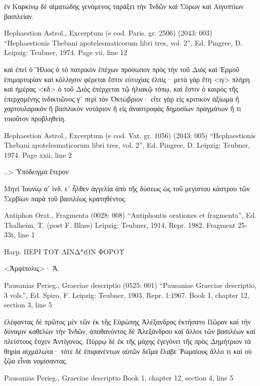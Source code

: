 \documentclass[12pt,letterpaper,twoside,final]{memoir}
\begin{document}
\begin{greek}
       ἐν Καρκίνῳ δὲ αἱματώδης γενόμενος ταράξει τὴν 
Ἰνδῶν καὶ Σύρων καὶ Αἰγυπτίων βασιλείαν. 



Hephaestion Astrol., Excerptum (e cod. Paris. gr. 2506) (2043: 003)
“Hephaestionis Thebani apotelesmaticorum libri tres, vol. 2”, Ed. Pingree, D.
Leipzig: Teubner, 1974.
Page vii, line 12

      καὶ ἐπεὶ ὁ Ἥλιος ὁ τὸ πατρικὸν ἐπέχων πρόσωπον 
πρὸς τὴν τοῦ Διὸς καὶ Ἑρμοῦ ἐπιμαρτυρίαν καὶ κόλλησιν 
φέρεται ἔστιν εὐτυχίας ἐλπίς· μετὰ γὰρ ἔτη <ιγ> πλήρη 
καὶ ἡμέρας <κδ> ὁ τοῦ Διὸς ἐπέρχεται τῷ ἡλιακῷ 
τόπῳ, καὶ ἔστιν ὁ καιρὸς τῆς ἐπερχομένης ἰνδικτιῶνος 
γʹ περὶ τὸν Ὀκτώβριον· εἴτε γὰρ εἰς κριτικὸν ἀξίωμα ἢ 
χαρτουλαρικὸν ἢ βασιλικὸν νοτάριον ἢ εἰς ἀναστροφὰς 
δημοσίων πραγμάτων ἤ τι τοιοῦτον προβληθείη. 



Hephaestion Astrol., Excerptum (e cod. Vat. gr. 1056) (2043: 005)
“Hephaestionis Thebani apotelesmaticorum libri tres, vol. 2”, Ed. Pingree, D.
Leipzig: Teubner, 1974.
Page xxii, line 2

                                                  ..>   
Ὑπόδειγμα ἕτερον


 Μηνὶ Ἰουνίῳ αʹ ἰνδ. εʹ ἦλθεν ἀγγελία ἀπὸ τῆς δύσεως 
ὡς τοῦ μεγίστου κάστρου τῶν Σερβίων παρὰ τοῦ βασιλέως 
κρατηθέντος. 



Antiphon Orat., Fragmenta (0028: 008)
“Antiphontis orationes et fragmenta”, Ed. Thalheim, T. (post F. Blass)
Leipzig: Teubner, 1914, Repr. 1982.
Fragment 25-33t, line 1

                                                   Harp. 
ΠΕΡΙ ΤΟΥ ΛΙΝΔ*ιΩΝ ΦΟΡΟΥ


<Ἀμφίπολις>· Ἀ. 



Pausanias Perieg., Graeciae descriptio (0525: 001)
“Pausaniae Graeciae descriptio, 3 vols.”, Ed. Spiro, F.
Leipzig: Teubner, 1903, Repr. 1:1967.
Book 1, chapter 12, section 3, line 5

                           ἐλέφαντας δὲ πρῶτος μὲν 
τῶν ἐκ τῆς Εὐρώπης Ἀλέξανδρος ἐκτήσατο Πῶρον καὶ 
τὴν δύναμιν καθελὼν τὴν Ἰνδῶν, ἀποθανόντος δὲ 
Ἀλεξάνδρου καὶ ἄλλοι τῶν βασιλέων καὶ πλείστους 
ἔσχεν Ἀντίγονος, Πύρρῳ δὲ ἐκ τῆς μάχης ἐγεγόνει 
τῆς πρὸς Δημήτριον τὰ θηρία αἰχμάλωτα· τότε δὲ 
ἐπιφανέντων αὐτῶν δεῖμα ἔλαβε Ῥωμαίους ἄλλο τι 
καὶ οὐ ζῷα εἶναι νομίσαντας. 



Pausanias Perieg., Graeciae descriptio 
Book 1, chapter 12, section 4, line 5


\end{greek}
\end{document}

